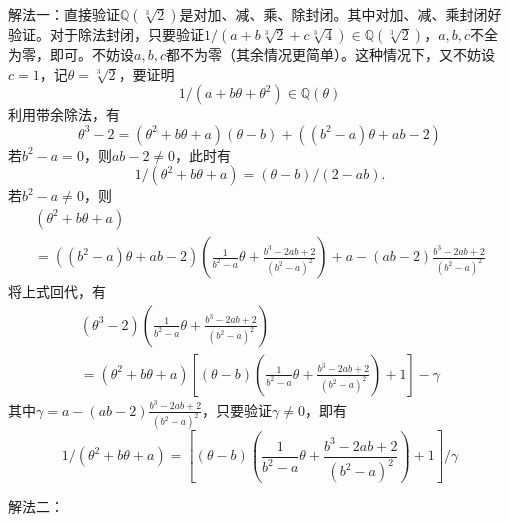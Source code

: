 解法一：直接验证$\mathbb{Q}(\sqrt[3]{2})$是对加、减、乘、除封闭。其中对加、减、乘封闭好验证。对于除法封闭，只要验证$1/(a + b\sqrt[3]{2} + c\sqrt[3]{4}) \in \mathbb{Q}(\sqrt[3]{2})$，$a,b,c$不全为零，即可。不妨设$a,b,c$都不为零（其余情况更简单）。这种情况下，又不妨设$c=1$，记$\theta = \sqrt[3]{2}$，要证明
$$1/(a + b\theta + \theta^2) \in \mathbb{Q}(\theta)$$
利用带余除法，有
$$\theta^3-2 = (\theta^2 + b\theta + a) (\theta-b) + ((b^2-a)\theta + ab-2)$$
若$b^2-a=0$，则$ab-2\neq 0$，此时有
$$1/(\theta^2 + b\theta + a) = (\theta-b)/(2-ab).$$
若$b^2-a\neq 0$，则
\begin{multline*}
(\theta^2 + b\theta + a) \\
= ((b^2-a)\theta + ab-2) \left(\frac{1}{b^2-a}\theta + \frac{b^3 - 2ab + 2}{(b^2-a)^2} \right) + a - (ab-2)\frac{b^3 - 2ab + 2}{(b^2-a)^2}
\end{multline*}
将上式回代，有
\begin{multline*}
(\theta^3-2) \left(\frac{1}{b^2-a}\theta + \frac{b^3 - 2ab + 2}{(b^2-a)^2} \right) \\
= (\theta^2 + b\theta + a) \left[ (\theta-b) \left(\frac{1}{b^2-a}\theta + \frac{b^3 - 2ab + 2}{(b^2-a)^2} \right) + 1 \right] - \gamma
\end{multline*}
其中$\gamma = a - (ab-2)\frac{b^3 - 2ab + 2}{(b^2-a)^2}$，只要验证$\gamma\neq 0$，即有
$$1/(\theta^2 + b\theta + a) = \left[ (\theta-b) \left(\frac{1}{b^2-a}\theta + \frac{b^3 - 2ab + 2}{(b^2-a)^2} \right) + 1 \right] / \gamma$$

解法二：

